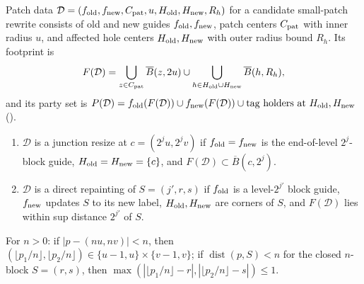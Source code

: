 \begin{definition}
    \label{def:peps_dyadic_guide_patch_rewrite}
    \leanok
    Patch data $\mathcal D=(f_{\rm old},f_{\rm new},C_{\rm pat},u,H_{\rm old},H_{\rm new},R_h)$
    for a candidate small-patch rewrite consists of old and new guides
    $f_{\rm old},f_{\rm new}$, patch centers $C_{\rm pat}$ with inner radius $u$,
    and affected hole centers $H_{\rm old},H_{\rm new}$ with outer radius bound
    $R_h$. Its footprint is
    \begin{align}
        F(\mathcal D)=\bigcup_{z\in C_{\rm pat}}\overline B(z,2u)
        \cup\bigcup_{h\in H_{\rm old}\cup H_{\rm new}}\overline B(h,R_h),
        \label{eq:pdg_patch_footprint}
    \end{align}
    and its party set is
    $P(\mathcal D)=f_{\rm old}(F(\mathcal D))\cup f_{\rm new}(F(\mathcal D))\cup\text{tag holders at }H_{\rm old},H_{\rm new}$
    (\cite[Section~6, condition~4]{OpenAI2026PolynomialPEPS}).
    \begin{enumerate}
        \item $\mathcal D$ is a junction resize at $c=(2^ju,2^jv)$ if
              $f_{\rm old}=f_{\rm new}$ is the end-of-level $2^j$-block guide,
              $H_{\rm old}=H_{\rm new}=\{c\}$, and
              $F(\mathcal D)\subset\overline B(c,2^j)$.
        \item $\mathcal D$ is a direct repainting of $S=(j',r,s)$ if $f_{\rm old}$
              is a level-$2^{j'}$ block guide, $f_{\rm new}$ updates $S$ to its new
              label, $H_{\rm old},H_{\rm new}$ are corners of $S$, and
              $F(\mathcal D)$ lies within sup distance $2^{j'}$ of $S$.
    \end{enumerate}
\end{definition}

\begin{lemma}
    \label{thm:peps_dyadic_block_index_near}
    \leanok
    For $n>0$: if $|p-(nu,nv)|<n$, then
    $(\lfloor p_1/n\rfloor,\lfloor p_2/n\rfloor)\in\{u-1,u\}\times\{v-1,v\}$; if
    $\operatorname{dist}(p,S)<n$ for the closed $n$-block $S=(r,s)$, then
    $\max(|\lfloor p_1/n\rfloor-r|,|\lfloor p_2/n\rfloor-s|)\le1$.
\end{lemma}

